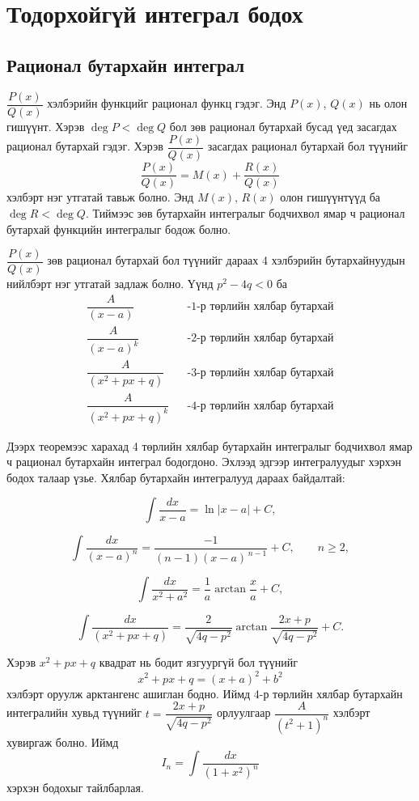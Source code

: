  \chapter{Тодорхойгүй интеграл бодох}
\section{Рационал бутархайн интеграл}
$\dfrac{P(x)}{Q(x)}$ хэлбэрийн функцийг рационал функц гэдэг. Энд $P(x)$, $Q(x)$ нь олон гишүүнт. Хэрэв  $\deg P<\deg Q$ бол зөв рационал бутархай бусад үед засагдах рационал бутархай гэдэг. Хэрэв $\dfrac{P(x)}{Q(x)}$ засагдах рационал бутархай бол түүнийг 
$$\dfrac{P(x)}{Q(x)}=M(x)+\dfrac{R(x)}{Q(x)}$$ хэлбэрт нэг утгатай тавьж болно. Энд $M(x),\, R(x)$  олон гишүүнтүүд ба $\deg R<\deg Q$. Тиймээс зөв бутархайн интегралыг бодчихвол ямар ч рационал бутархай функцийн интегралыг бодож болно. 
\begin{theorem}
$\dfrac{P(x)}{Q(x)}$ зөв рационал бутархай бол түүнийг дараах 4 хэлбэрийн бутархайнуудын нийлбэрт нэг утгатай задлаж болно. Үүнд $p^2-4q<0$ ба 
 \begin{eqnarray}
\dfrac{A}{(x-a)}&&\text{-1-р төрлийн хялбар бутархай}\nonumber\\
\dfrac{A}{(x-a)^k}&&\text{-2-р төрлийн хялбар бутархай}\nonumber\\
\dfrac{A}{(x^2+px+q)}&&\text{-3-р төрлийн хялбар бутархай}\nonumber\\
\dfrac{A}{(x^2+px+q)^k}&&\text{-4-р төрлийн хялбар бутархай}\nonumber
\end{eqnarray}
\end{theorem}
Дээрх теоремээс харахад 4 төрлийн хялбар бутархайн интегралыг бодчихвол ямар ч рационал бутархайн интеграл бодогдоно. Эхлээд эдгээр интегралуудыг хэрхэн бодох талаар үзье. 
Хялбар бутархайн интегралууд дараах байдалтай:

\[
\int \frac{dx}{x-a}=\ln|x-a|+C,
\]

\[
\int \frac{dx}{(x-a)^n}=\frac{-1}{(n-1)(x-a)^{\,n-1}}+C,
\qquad n\ge 2,
\]

\[
\int\frac{dx}{x^2+a^2}=\frac{1}{a}\arctan\frac{x}{a}+C,
\]

\[
\int\frac{dx}{(x^2+px+q)}=\frac{2}{\sqrt{4q-p^2}}
\arctan\frac{2x+p}{\sqrt{4q-p^2}}+C.
\]

Хэрэв $x^2+px+q$ квадрат нь бодит язгуургүй бол түүнийг
\[
x^2+px+q=(x+a)^2+b^2
\]
хэлбэрт оруулж арктангенс ашиглан бодно.  Иймд 4-р төрлийн хялбар бутархайн интегралийн хувьд түүнийг $t=\dfrac{2x+p}{\sqrt{4q-p^2}}$ орлуулгаар $\dfrac{A}{(t^2+1)^n}$ хэлбэрт хувиргаж болно. Иймд
$$\displaystyle I_n = \int \frac{dx}{(1+x^2)^n}$$ хэрхэн бодохыг тайлбарлая.\\

